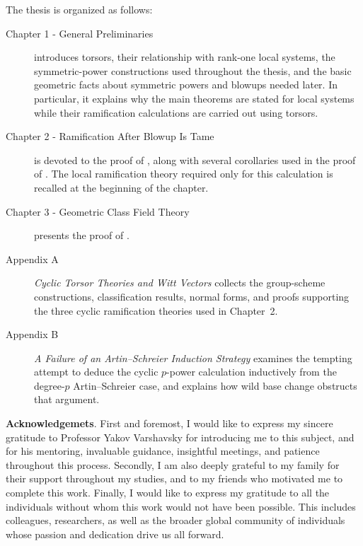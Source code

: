 The thesis is organized as follows:

\begin{description}
    \item[Chapter 1 - General Preliminaries] introduces torsors, their relationship with rank-one local systems, the symmetric-power constructions used throughout the thesis, and the basic geometric facts about symmetric powers and blowups needed later. In particular, it explains why the main theorems are stated for local systems while their ramification calculations are carried out using torsors.
    \item[Chapter 2 - Ramification After Blowup Is Tame] is devoted to the proof of , along with several corollaries used in the proof of . The local ramification theory required only for this calculation is recalled at the beginning of the chapter.
    \item[Chapter 3 - Geometric Class Field Theory] presents the proof of .
    \item[Appendix A] \emph{Cyclic Torsor Theories and Witt Vectors} collects the group-scheme constructions, classification results, normal forms, and proofs supporting the three cyclic ramification theories used in Chapter~2.
    \item[Appendix B] \emph{A Failure of an Artin--Schreier Induction Strategy} examines the tempting attempt to deduce the cyclic $p$-power calculation inductively from the degree-$p$ Artin--Schreier case, and explains how wild base change obstructs that argument.
\end{description}

\noindent \textbf{Acknowledgemets}. First and foremost, I would like to express my sincere gratitude to Professor Yakov Varshavsky for introducing me to this subject, and for his mentoring, invaluable guidance, insightful meetings, and patience throughout this process.
Secondly, I am also deeply grateful to my family for their support throughout my studies, and to my friends who motivated me to complete this work.
Finally, I would like to express my gratitude to all the individuals without whom this work would not have been possible. This includes colleagues, researchers, as well as the broader global community of individuals whose passion and dedication drive us all forward.





